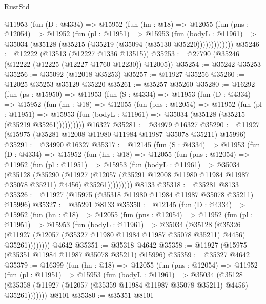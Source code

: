 \begin{lexlean}{RustStd}
\begin{coremodule}
        @11953
          (fun (D : @4334) =>
          @15952
            (fun (hn : @18) =>
            @12055
              (fun (pns : @12054) =>
              @11952
                (fun (pl : @11951) =>
                @15953
                  (fun (bodyL : @11961) =>
                  @35034 (@35128 (@35215 (@35219 (@35094 (@35130 @35220)))))))))))))
@35246 := @12222 (@13513 (@12227 @1336 @13515))
@35253 := @27790 (@35246 (@12222 (@12225 (@12227 @1760 @12230)) @12005))
@35254 := @35242 @35253
@35256 := @35092 (@12018 @35253)
@35257 := @11927 @35256
@35260 := @12025 @35253 @35129 @35220
@35261 := @35257 @35260
@35280 := @16292
    (fun (ps : @15950) =>
    @11953
      (fun (S : @4334) =>
      @11953
        (fun (D : @4334) =>
        @15952
          (fun (hn : @18) =>
          @12055
            (fun (pns : @12054) =>
            @11952
              (fun (pl : @11951) =>
              @15953 (fun (bodyL : @11961) => @35034 (@35128 (@35215 (@35219 @35261))))))))))
    @16327
@35281 := @34979 @16327
@35290 := @11927 (@15975 (@35281 @12008 @11980 @11984 @11987 @35078 @35211) @15996)
@35291 := @34990 @16327
@35317 := @12145
    (fun (S : @4334) =>
    @11953
      (fun (D : @4334) =>
      @15952
        (fun (hn : @18) =>
        @12055
          (fun (pns : @12054) =>
          @11952
            (fun (pl : @11951) =>
            @15953
              (fun (bodyL : @11961) =>
              @35034
                (@35128
                  (@35290
                    (@11927
                      (@12057 (@35291 @12008 @11980 @11984 @11987 @35078 @35211) @4456)
                      @35261)))))))))
    @8133
@35318 := @35281 @8133
@35326 := @11927 (@15975 (@35318 @11980 @11984 @11987 @35078 @35211) @15996)
@35327 := @35291 @8133
@35350 := @12145
    (fun (D : @4334) =>
    @15952
      (fun (hn : @18) =>
      @12055
        (fun (pns : @12054) =>
        @11952
          (fun (pl : @11951) =>
          @15953
            (fun (bodyL : @11961) =>
            @35034
              (@35128
                (@35326
                  (@11927 (@12057 (@35327 @11980 @11984 @11987 @35078 @35211) @4456) @35261))))))))
    @4642
@35351 := @35318 @4642
@35358 := @11927 (@15975 (@35351 @11984 @11987 @35078 @35211) @15996)
@35359 := @35327 @4642
@35379 := @16399
    (fun (hn : @18) =>
    @12055
      (fun (pns : @12054) =>
      @11952
        (fun (pl : @11951) =>
        @15953
          (fun (bodyL : @11961) =>
          @35034
            (@35128
              (@35358 (@11927 (@12057 (@35359 @11984 @11987 @35078 @35211) @4456) @35261)))))))
    @8101
@35380 := @35351 @8101

\end{coremodule}
\end{lexlean}
